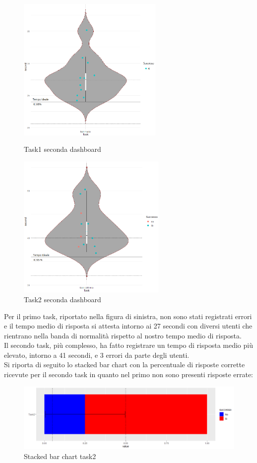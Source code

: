 \documentclass[12pt]{article}
\begin{document}
\begin{figure}[H]
	\begin{minipage}[b]{0.48\textwidth}
		\centering
		\includegraphics[width=\textwidth, height=7cm]{img/task/Dash2_TaskMarzo.png}
        \caption{Task1 seconda dashboard}
	\end{minipage}
	\hfill
	\begin{minipage}[b]{0.48\textwidth}
		\centering
		\includegraphics[width=\textwidth, height=7cm]{img/task/Dash2_TaskCalifornia.png}
        \caption{Task2 seconda dashboard}
	\end{minipage}
\end{figure}
\noindent Per il primo task, riportato nella figura di sinistra, non sono stati registrati errori e il tempo medio di risposta si attesta intorno ai 27 secondi con diversi utenti che rientrano nella banda di normalità rispetto al nostro tempo medio di risposta.\\
Il secondo task, più complesso, ha fatto registrare un tempo di risposta medio più elevato, intorno a 41 secondi, e 3 errori da parte degli utenti.\\
Si riporta di seguito lo stacked bar chart con la percentuale di risposte corrette ricevute per il secondo task in quanto nel primo non sono presenti risposte errate:
\begin{figure}[H]
    \centering
    \includegraphics[scale = 0.45]{img/task/Dash2_TaskCalifornia_ErrorBar.png}
    \caption{Stacked bar chart task2}
\end{figure}
\end{document}
